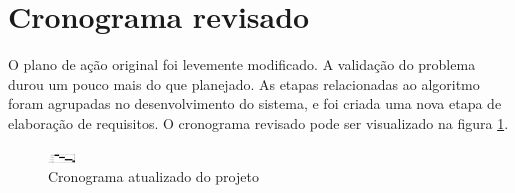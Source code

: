 \section{Cronograma revisado}

O plano de ação original foi levemente modificado. A validação do problema durou um pouco mais do que planejado. As etapas relacionadas ao algoritmo foram agrupadas no desenvolvimento do sistema, e foi criada uma nova etapa de elaboração de requisitos. O cronograma revisado pode ser visualizado na figura \ref{fig-cronograma-atualizado}.

\begin{figure}[ht!]
    \begin{center}
    \includegraphics[width=20pt]{figuras/cronograma-atualizado}
    \caption{Cronograma atualizado do projeto}
    \label{fig-cronograma-atualizado}
    \end{center}
\end{figure}